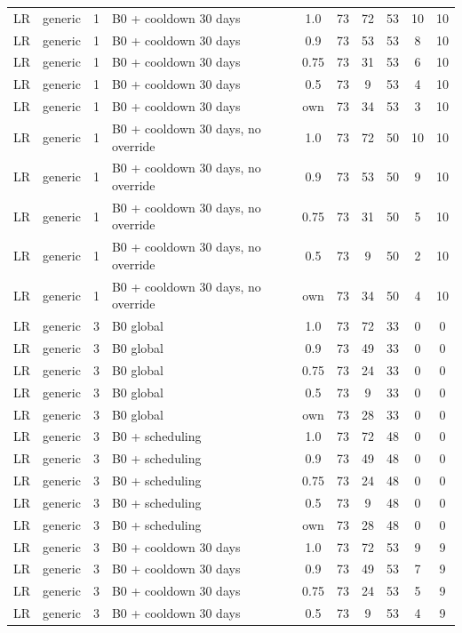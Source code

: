 \documentclass[10pt,onecolumn,letterpaper]{article}
\begin{document}
\begin{longtable}{lllp{4.4cm}cccccc}
LR & generic & 1 & B0 + cooldown 30 days & 1.0 & 73 & 72 & 53 & 10 & 10 \\
LR & generic & 1 & B0 + cooldown 30 days & 0.9 & 73 & 53 & 53 & 8 & 10 \\
LR & generic & 1 & B0 + cooldown 30 days & 0.75 & 73 & 31 & 53 & 6 & 10 \\
LR & generic & 1 & B0 + cooldown 30 days & 0.5 & 73 & 9 & 53 & 4 & 10 \\
LR & generic & 1 & B0 + cooldown 30 days & own & 73 & 34 & 53 & 3 & 10 \\
LR & generic & 1 & B0 + cooldown 30 days, no override & 1.0 & 73 & 72 & 50 & 10 & 10 \\
LR & generic & 1 & B0 + cooldown 30 days, no override & 0.9 & 73 & 53 & 50 & 9 & 10 \\
LR & generic & 1 & B0 + cooldown 30 days, no override & 0.75 & 73 & 31 & 50 & 5 & 10 \\
LR & generic & 1 & B0 + cooldown 30 days, no override & 0.5 & 73 & 9 & 50 & 2 & 10 \\
LR & generic & 1 & B0 + cooldown 30 days, no override & own & 73 & 34 & 50 & 4 & 10 \\
LR & generic & 3 & B0 global & 1.0 & 73 & 72 & 33 & 0 & 0 \\
LR & generic & 3 & B0 global & 0.9 & 73 & 49 & 33 & 0 & 0 \\
LR & generic & 3 & B0 global & 0.75 & 73 & 24 & 33 & 0 & 0 \\
LR & generic & 3 & B0 global & 0.5 & 73 & 9 & 33 & 0 & 0 \\
LR & generic & 3 & B0 global & own & 73 & 28 & 33 & 0 & 0 \\
LR & generic & 3 & B0 + scheduling & 1.0 & 73 & 72 & 48 & 0 & 0 \\
LR & generic & 3 & B0 + scheduling & 0.9 & 73 & 49 & 48 & 0 & 0 \\
LR & generic & 3 & B0 + scheduling & 0.75 & 73 & 24 & 48 & 0 & 0 \\
LR & generic & 3 & B0 + scheduling & 0.5 & 73 & 9 & 48 & 0 & 0 \\
LR & generic & 3 & B0 + scheduling & own & 73 & 28 & 48 & 0 & 0 \\
LR & generic & 3 & B0 + cooldown 30 days & 1.0 & 73 & 72 & 53 & 9 & 9 \\
LR & generic & 3 & B0 + cooldown 30 days & 0.9 & 73 & 49 & 53 & 7 & 9 \\
LR & generic & 3 & B0 + cooldown 30 days & 0.75 & 73 & 24 & 53 & 5 & 9 \\
LR & generic & 3 & B0 + cooldown 30 days & 0.5 & 73 & 9 & 53 & 4 & 9 \\

\end{longtable}
\end{document}
